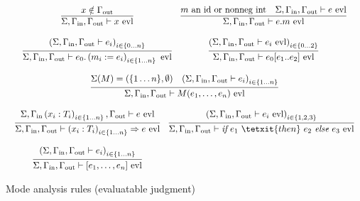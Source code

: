\documentclass[11pt]{article}
\begin{document}
\begin{figure}[h]
  \[
    \begin{array}{c}
      \begin{array}{cc}
        \infer{
          \Sigma,\Gamma_{\text{in}}, \Gamma_{\text{out}} \vdash x\ \text{evl}
        }{
          x \notin \Gamma_{\text{out}}
        }
       & \infer{
          \Sigma,\Gamma_{\text{in}}, \Gamma_{\text{out}} \vdash e.m\ \text{evl}
        }{
          m \text{ an id or nonneg int}
          & \Sigma,\Gamma_{\text{in}}, \Gamma_{\text{out}} \vdash e\ \text{evl}
        }
        \\ \\
        \infer{
          \Sigma,\Gamma_{\text{in}}, \Gamma_{\text{out}} \vdash e_0.\left(m_i := e_i\right)_{i \in \{1 \ldots n\}}\ \text{evl}
        }{
          \left(\Sigma,\Gamma_{\text{in}},\Gamma_{\text{out}} \vdash e_i \right)_{i \in \{0 \ldots n\}}
        }
        & \infer{
          \Sigma,\Gamma_{\text{in}}, \Gamma_{\text{out}} \vdash e_0[e_1 .. e_2]\ \text{evl}
        }{
          \left(\Sigma,\Gamma_{\text{in}},\Gamma_{\text{out}} \vdash e_i\ \text{evl}\right)_{i \in \{0 \ldots 2\}}
        }
      \end{array}
      \\ \\
      \infer{
        \Sigma,\Gamma_{\text{in}}, \Gamma_{\text{out}} \vdash M(e_1,\ldots,e_{n})\ \text{evl}
      }{
        \Sigma(M) = (\{1 \ldots n\},\emptyset)
        & \left(\Sigma,\Gamma_{\text{in}},\Gamma_{\text{out}} \vdash e_i \right)_{i \in \{1 \ldots n\}}
      }
      \\ \\
      \begin{array}{cc}
        \infer{
          \Sigma,\Gamma_{\text{in}},\Gamma_{\text{out}} \vdash \left(x_i:T_i\right)_{i \in \{1 \ldots n\}} \Rightarrow e\ \text{evl}
        }{
          \Sigma,\Gamma_{\text{in}}\left(x_i:T_i\right)_{i \in \{1 \ldots n\}},\Gamma_{\text{out}} \vdash e\ \text{evl}
        }
        & \infer{
          \Sigma,\Gamma_{\text{in}},\Gamma_{\text{out}} \vdash \textit{if}\ e_1\ \tetxit{then}\ e_2\ \textit{else}\ e_3\ \text{evl}
        }{
          \left(\Sigma, \Gamma_{\text{in}}, \Gamma_{\text{out}} \vdash e_i\ \text{evl}\right)_{i \in \{1,2,3\}}
        }
        \\ \\
        \infer{
          \Sigma,\Gamma_{\text{in}},\Gamma_{\text{out}} \vdash [e_1,\ldots,e_n]\ \text{evl}
        }{
          \left(\Sigma,\Gamma_{\text{in}},\Gamma_{\text{out}} \vdash e_i\right)_{i \in \{1 \ldots n\}}
        }
      \end{array}
    \end{array}
  \]
  \label{fig:rules-evaluatable}
  \caption{Mode analysis rules (evaluatable judgment)}
\end{figure}
\end{document}
